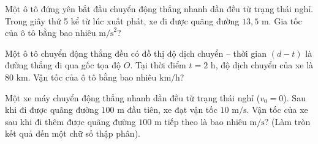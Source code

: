 \begin{ex}
	Một ô tô đứng yên bắt đầu chuyển động thẳng nhanh dần đều từ trạng thái nghỉ. Trong giây thứ 5 kể từ lúc xuất phát, xe đi được quãng đường $13{,}5\text{ m}$. Gia tốc của ô tô bằng bao nhiêu $\text{m/s}^2$?

	\par{}
\end{ex}

\begin{ex}
	Một ô tô chuyển động thẳng đều có đồ thị độ dịch chuyển -- thời gian $(d - t)$ là đường thẳng đi qua gốc tọa độ $O$. Tại thời điểm $t = 2\text{ h}$, độ dịch chuyển của xe là $80\text{ km}$. Vận tốc của ô tô bằng bao nhiêu $\text{km/h}$?

	\par{}
\end{ex}

\begin{ex}
	Một xe máy chuyển động thẳng nhanh dần đều từ trạng thái nghỉ ($v_0 = 0$). Sau khi đi được quãng đường $100\text{ m}$ đầu tiên, xe đạt vận tốc $10\text{ m/s}$. Vận tốc của xe sau khi đi thêm được quãng đường $100\text{ m}$ tiếp theo là bao nhiêu $\text{m/s}$? (Làm tròn kết quả đến một chữ số thập phân).

	\par{}
\end{ex}

